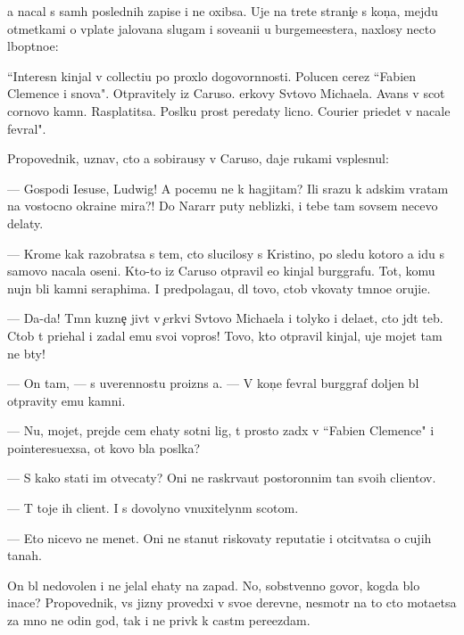 \documentclass[10pt]{book}
\begin{document}
{\Y}a nacal s sam{\yi}h poslednih zapise{\y} i ne oxibsa. Uje na tret{\y}e{\y} strani{\c}e s kon{\c}a, mejdu otmetkami o v{\yi}plate jalovan{\y}a slugam i sove{\x}ani{\y}i u burgemeestera, naxlosy necto l{\io}bop{\yi}tno{\y}e:

``Interesn{\yi}{\y} kinjal v collecti{\y}u po proxlo{\y} dogovor{\e}nnosti. Polucen cerez ``Fabien Clemence i s{\yi}nov{\y}a". Otpravitely iz Caruso. {\C}erkovy Sv{\ia}tovo Michaela. Avans v scot cornovo kamn{\ia}. Rasplatitsa. Pos{\yi}lku pros{\ia}t peredaty licno. Courier pri{\y}edet v nacale fevral{\ia}".



Propovednik, uznav, cto {\y}a sobira{\y}usy v Caruso, daje rukami vsplesnul:

— Gospodi Iesuse, Ludwig! A pocemu ne k hagjitam? Ili srazu k adskim vratam na vostocno{\y} okra{\y}ine mira?! Do Nararr{\yi} puty neblizki{\y}, i tebe tam sovsem necevo delaty.

— Krome kak razobratsa s tem, cto slucilosy s Kristino{\y}, po sledu kotoro{\y} {\y}a idu s samovo nacala oseni. Kto-to iz Caruso otpravil {\y}e{\y}o kinjal burggrafu. Tot, komu nujn{\yi} b{\yi}li kamni seraphima. I predpolaga{\y}u, dl{\ia} tovo, ctob{\yi} v{\yi}kovaty t{\e}mno{\y}e oruji{\y}e.

— Da-da! T{\e}mn{\yi}{\y} kuzne{\c} jiv{\e}t v {\c}erkvi Sv{\ia}tovo Michaela i tolyko i dela{\y}et, cto jd{\e}t teb{\ia}. Ctob{\yi} t{\yi} pri{\y}ehal i zadal {\y}emu svo{\y}i vopros{\yi}! Tovo, kto otpravil kinjal, uje mojet tam ne b{\yi}ty!

— On tam, — s uverennost{\y}u proizn{\e}s {\y}a. — V kon{\c}e fevral{\ia} burggraf doljen b{\yi}l otpravity {\y}emu kamni.

— Nu, mojet, prejde cem {\y}ehaty sotni lig, t{\yi} prosto za{\y}d{\e}x v ``Fabien Clemence" i pointeresu{\y}exsa, ot kovo b{\yi}la pos{\yi}lka?

— S kako{\y} stati im otvecaty? Oni ne raskr{\yi}va{\y}ut postoronnim ta{\y}n{\yi} svo{\y}ih clientov.

— T{\yi} toje ih client. I s dovolyno vnuxitelyn{\yi}m scotom.

— Eto nicevo ne men{\ia}{\y}et. Oni ne stanut riskovaty reputati{\y}e{\y} i otcit{\yi}vatsa o cujih ta{\y}nah.

On b{\yi}l nedovolen i ne jelal {\y}ehaty na zapad. No, sobstvenno govor{\ia}, kogda b{\yi}lo inace? Propovednik, vs{\io} jizny provedxi{\y} v svo{\y}e{\y} derevne, nesmotr{\ia} na to cto mota{\y}etsa za mno{\y} ne odin god, tak i ne priv{\yi}k k cast{\yi}m pere{\y}ezdam.
\end{document}

